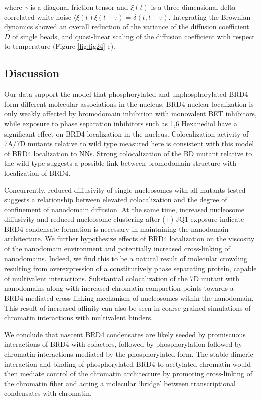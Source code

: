 where $\gamma$ is a diagonal friction tensor and $\xi(t)$ is a three-dimensional delta-correlated white noise $\langle \xi(t)\xi(t+\tau)  = \delta(t,t+\tau)$. Integrating the Brownian dynamics showed an overall reduction of the variance of the diffusion coefficient $D$ of single beads, and quasi-linear scaling of the diffusion coefficient with respect to temperature (Figure \ref{fig:fig24} e).

\subsection{Discussion}

Our data support the model that phosphorylated and unphosphorylated BRD4 form different molecular associations in the nucleus. BRD4 nuclear localization is only weakly affected by bromodomain inhibition with monovalent BET inhibitors, while exposure to phase separation inhibitors such as 1,6 Hexanediol have a significant effect on BRD4 localization in the nucleus. Colocalization activity of 7A/7D mutants relative to wild type measured here is consistent with this model of BRD4 localization to NNs. Strong colocalization of the BD mutant relative to the wild type suggests a possible link between bromodomain structure with localization of BRD4. 

Concurrently, reduced diffusivity of single nucleosomes with all mutants tested suggests a relationship between elevated colocalization and the degree of confinement of nanodomain diffusion. At the same time, increased nucleosome diffusivity and reduced nucleosome clustering after (+)-JQ1 exposure indicate BRD4 condensate formation is necessary in maintaining the nanodomain architecture. We further hypothesize effects of BRD4 localization on the viscosity of the nanodomain environment and potentially increased cross-linking of nanodomains. Indeed, we find this to be a natural result of molecular crowding resulting from overexpression of a constitutively phase separating protein, capable of multivalent interactions. Substantial colocalization of the 7D mutant with nanodomains along with increased chromatin compaction points towards a BRD4-mediated cross-linking mechanism of nucleosomes within the nanodomain. This result of increased affinity can also be seen in coarse grained simulations of chromatin interactions with multivalent binders.
 
We conclude that nascent BRD4 condensates are likely seeded by promiscuous interactions of BRD4 with cofactors, followed by phosphorylation followed by chromatin interactions mediated by the phosphorylated form. The stable dimeric interaction and binding of phosphorylated BRD4 to acetylated chromatin would then mediate control of the chromatin architecture by promoting cross-linking of the chromatin fiber and acting a molecular ‘bridge’ between transcriptional condensates with chromatin. 



